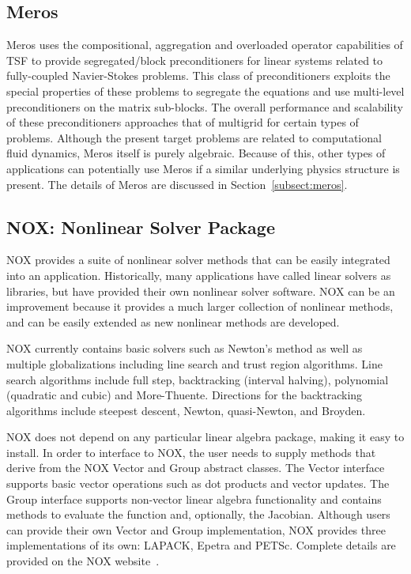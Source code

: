 \documentclass[acmtoms,acmnow]{acmtrans2m}
\begin{document}
\subsection{Meros}

Meros uses the compositional, aggregation and overloaded operator capabilities of
TSF to provide segregated/block preconditioners for linear systems
related to fully-coupled Navier-Stokes problems.  This class of
preconditioners exploits the special properties of these problems to
segregate the equations and use multi-level preconditioners on the
matrix sub-blocks.  The overall performance and scalability of these
preconditioners approaches that of multigrid for certain types of
problems.  Although the present target problems are related to
computational fluid dynamics, Meros itself is purely algebraic.
Because of this, other types of applications can potentially use Meros
if a similar underlying physics structure is present.  The details of
Meros are discussed in Section~\ref{subsect:meros}.


\subsection{NOX: Nonlinear Solver Package}

NOX provides a suite of nonlinear solver methods that can be easily
integrated into an application.  Historically, many applications have
called linear solvers as libraries, but have provided their own
nonlinear solver software.  NOX can be an improvement because it
provides a much larger collection of nonlinear methods, and can be
easily extended as new nonlinear methods are developed.

NOX currently contains basic solvers such as Newton's method as well
as multiple globalizations including line search and trust
region algorithms. Line search algorithms include full step,
backtracking (interval halving), polynomial (quadratic and cubic) and
More-Thuente.  Directions for the backtracking algorithms include
steepest descent, Newton, quasi-Newton, and Broyden.

NOX does not depend on any particular linear algebra package, making
it easy to install. In order to interface to NOX, the user needs to
supply methods that derive from the NOX Vector and Group abstract
classes.  The Vector interface supports basic vector operations such
as dot products and vector updates. The Group interface supports
non-vector linear algebra functionality and contains methods to
evaluate the function and, optionally, the Jacobian.  
Although users can provide their own Vector and Group implementation,
NOX provides three implementations of its own: LAPACK, Epetra and
PETSc.  Complete details
are provided on the NOX website~\cite{NOX-home-page}.
\end{document}

